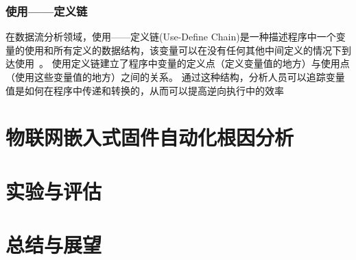 \subsubsection{使用——定义链}
在数据流分析领域，使用——定义链(Use-Define Chain)是一种描述程序中一个变量的使用和所有定义的数据结构，该变量可以在没有任何其他中间定义的情况下到达使用~\cite{Compilers2007}。
使用定义链建立了程序中变量的定义点（定义变量值的地方）与使用点（使用这些变量值的地方）之间的关系。
通过这种结构，分析人员可以追踪变量值是如何在程序中传递和转换的，从而可以提高逆向执行中的效率



\section{物联网嵌入式固件自动化根因分析}


\section{实验与评估}


\section{总结与展望}

